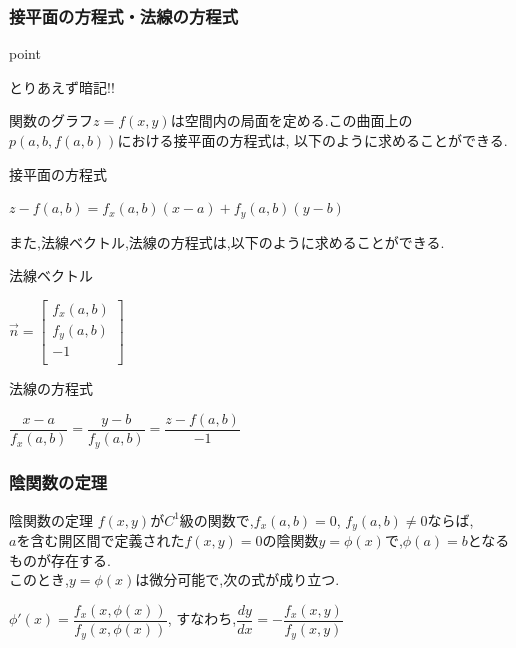 \documentclass[a4paper]{jsarticle}
\begin{document}
\subsubsection{接平面の方程式・法線の方程式}
\begin{itembox}[l]{point}
    \begin{center}
        とりあえず暗記!!
    \end{center}
\end{itembox}
関数のグラフ$z=f\left(x,y\right)$は空間内の局面を定める.この曲面上の$p(a,b,f\left(a,b\right))$における接平面の方程式は,
以下のように求めることができる.
\begin{itembox}[l]{接平面の方程式}
    \begin{center}
        $z-f\left(a,b\right)=f_x\left(a,b\right)\left(x-a\right)+f_y\left(a,b\right)\left(y-b\right)$
    \end{center}
\end{itembox}
また,法線ベクトル,法線の方程式は,以下のように求めることができる.
\begin{itembox}[l]{法線ベクトル}
    \begin{center}
        $ \vec{n}=
            \begin{bmatrix}
                f_x\left(a,b\right) \\
                f_y\left(a,b\right) \\
                -1                  \\
            \end{bmatrix}
        $
    \end{center}
\end{itembox}
\begin{itembox}[l]{法線の方程式}
    \begin{center}
        $\dfrac{x-a}{f_x\left(a,b\right)}=\dfrac{y-b}{f_y\left(a,b\right)}=\dfrac{z-f\left(a,b\right)}{-1}$
    \end{center}
\end{itembox}
\subsubsection{陰関数の定理}
\begin{itembox}[l]{陰関数の定理}
    $f\left(x,y\right)$が$C^1$級の関数で,$f_x\left(a,b\right)=0$, $f_y\left(a,b\right)\neq0$ならば,\\
    $a$を含む開区間で定義された$f(x,y)=0$の陰関数$y=\phi\left(x\right)$で,$\phi\left(a\right)=b$となるものが存在する.\\
    このとき,$y=\phi\left(x\right)$は微分可能で,次の式が成り立つ.
    \begin{center}
        $\phi'\left(x\right)=\dfrac{f_x\left(x,\phi\left(x\right)\right)}{f_y\left(x,\phi\left(x\right)\right)}$,
        \quad すなわち,\quad$\dfrac{dy}{dx}=-\dfrac{f_x\left(x,y\right)}{f_y\left(x,y\right)}$
    \end{center}
\end{itembox}
\end{document}
